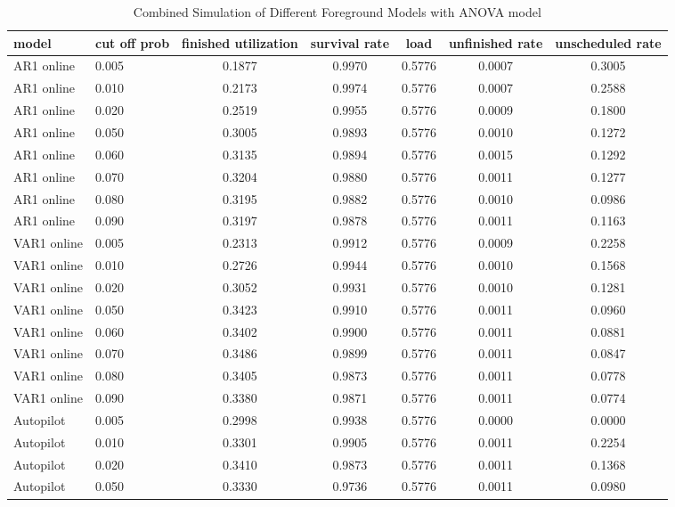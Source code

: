 \documentclass{article}
\begin{document}
\begin{longtable}[htbp]{l|l|*{5}{c}} 
  \caption{Combined Simulation of Different Foreground Models with ANOVA model}
  \label{tab:tab3.2.5}\\
  \textbf{model} & \textbf{cut off prob} & \textbf{finished utilization} &
  \textbf{survival rate} & \textbf{load} & \textbf{unfinished rate} &
  \textbf{unscheduled rate} \\
  \hline
  AR1 online & 0.005 & 0.1877 & 0.9970 & 0.5776 & 0.0007 & 0.3005\\
  AR1 online & 0.010 & 0.2173 & 0.9974 & 0.5776 & 0.0007 & 0.2588\\
  AR1 online & 0.020 & 0.2519 & 0.9955 & 0.5776 & 0.0009 & 0.1800\\
  AR1 online & 0.050 & 0.3005 & 0.9893 & 0.5776 & 0.0010 & 0.1272\\
  AR1 online & 0.060 & 0.3135 & 0.9894 & 0.5776 & 0.0015 & 0.1292\\
  AR1 online & 0.070 & 0.3204 & 0.9880 & 0.5776 & 0.0011 & 0.1277\\
  AR1 online & 0.080 & 0.3195 & 0.9882 & 0.5776 & 0.0010 & 0.0986\\
  AR1 online & 0.090 & 0.3197 & 0.9878 & 0.5776 & 0.0011 & 0.1163\\
  VAR1 online & 0.005 & 0.2313 & 0.9912 & 0.5776 & 0.0009 & 0.2258\\
  VAR1 online & 0.010 & 0.2726 & 0.9944 & 0.5776 & 0.0010 & 0.1568\\
  VAR1 online & 0.020 & 0.3052 & 0.9931 & 0.5776 & 0.0010 & 0.1281\\
  VAR1 online & 0.050 & 0.3423 & 0.9910 & 0.5776 & 0.0011 & 0.0960\\
  VAR1 online & 0.060 & 0.3402 & 0.9900 & 0.5776 & 0.0011 & 0.0881\\
  VAR1 online & 0.070 & 0.3486 & 0.9899 & 0.5776 & 0.0011 & 0.0847\\
  VAR1 online & 0.080 & 0.3405 & 0.9873 & 0.5776 & 0.0011 & 0.0778\\
  VAR1 online & 0.090 & 0.3380 & 0.9871 & 0.5776 & 0.0011 & 0.0774\\
  Autopilot & 0.005 & 0.2998 & 0.9938 & 0.5776 & 0.0000 & 0.0000\\
  Autopilot & 0.010 & 0.3301 & 0.9905 & 0.5776 & 0.0011 & 0.2254\\
  Autopilot & 0.020 & 0.3410 & 0.9873 & 0.5776 & 0.0011 & 0.1368\\
  Autopilot & 0.050 & 0.3330 & 0.9736 & 0.5776 & 0.0011 & 0.0980\\
\end{longtable}
\end{document}
